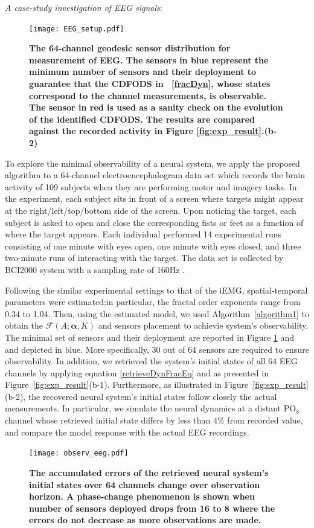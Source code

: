 \textit{A case-study investigation of EEG signals}:
\begin{figure}[htb]
\centering
\texttt{[image: EEG\_setup.pdf]}
\caption{\textbf{The 64-channel geodesic sensor distribution for measurement of EEG. The sensors in blue represent the minimum number of sensors and their deployment to guarantee that the CDFODS in ~\eqref{fracDyn}, whose states correspond to the channel measurements,  is observable. The sensor in red is used as a sanity check on the evolution of  the identified CDFODS. The results are compared against the recorded activity in Figure \ref{fig:exp_result}.(b-2) }}\label{fig:EEG_exp}
\vskip -2mm
\end{figure} 

To explore the minimal observability of a neural system, we apply the proposed algorithm to a 64-channel electroencephalogram data set which records the brain activity of 109 subjects when they are performing motor and imagery tasks. In the experiment, each subject sits in front of a screen where targets might appear at the right/left/top/bottom side of the screen. Upon noticing the target, each subject is asked to open and close the corresponding fists or feet as a function of where the target appears. Each individual performed 14 experimental runs consisting of one minute with eyes open, one minute with eyes closed, and three two-minute runs of interacting with the target. The data set is collected by BCI2000 system with a sampling rate of 160Hz \cite{Physio_EEG, Physio_EEG_2}.

Following the similar experimental settings to that of the iEMG, spatial-temporal parameters were estimated;in particular, the fractal order exponents range from 0.34 to 1.04. Then, using the estimated model, we used Algorithm~\ref{algorithm1} to obtain the $\mathcal F(A;\mathbf{\alpha},K)$ and sensors placement to achievie system's observability. The minimal set of sensors and their deployment are reported in Figure \ref{fig:EEG_exp} and  and depicted in blue. More specifically, 30 out of 64 sensors are required to ensure observability. In addition, we retrieved the system's initial states of all 64 EEG channels by applying equation \eqref{retrieveDynFracEq} and as presented  in Figure~\ref{fig:exp_result}(b-1). Furthermore, as illustrated in Figure~\ref{fig:exp_result}(b-2), the recovered neural system's initial states follow closely the actual measurements. In particular, we simulate the neural dynamics at a distant PO$_{8}$ channel whose retrieved initial state differs by less than $4\%$ from recorded value, and compare the model response with the actual EEG recordings. 
\begin{figure}[htb]
\centering
\texttt{[image: observ\_eeg.pdf]}
\caption{\textbf{The accumulated errors of the retrieved neural system's initial states over 64 channels change over observation horizon. A phase-change phenomenon is shown when number of sensors deployed drops from 16 to 8 where the errors do not decrease as more observations are made.}}\label{fig:observ_eeg}
\vskip -1mm
\end{figure} 

